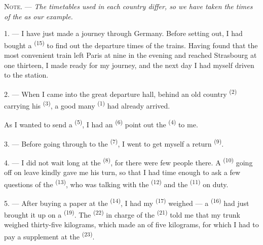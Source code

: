 
\VUsaut{4.0mm}
\VUsaut{2.4mm}
\VUsaut{3.4mm}
\textsc{Note.} --- \textit{The timetables used in each country differ, so
we have taken the times of the}  \textit{as our
example.}

1. --- I have just made a journey through Germany. Before setting out, I
had bought a  \textsuperscript{(15)} to find out the departure times
of the trains. Having found that the most convenient train left Paris at
nine in the evening and reached Strasbourg at one thirteen, I made ready
for my journey, and the next day I had myself driven to the station.

2. --- When I came into the great departure hall, behind an old country
 \textsuperscript{(2)} carrying his 
\textsuperscript{(3)}, a good many  \textsuperscript{(1)} had already
arrived.

As I wanted to send a  \textsuperscript{(5)}, I had an
 \textsuperscript{(6)} point out the 
\textsuperscript{(4)} to me.

3. --- Before going through to the  \textsuperscript{(7)}, I went
to get myself a return  \textsuperscript{(9)}.

4. --- I did not wait long at the  \textsuperscript{(8)}, for
there were few people there. A  \textsuperscript{(10)} going off on
leave kindly gave me his turn, so that I had time enough to ask a few
questions of the  \textsuperscript{(13)}, who was talking with
the  \textsuperscript{(12)} and the 
\textsuperscript{(11)} on duty.

\VUsaut{3.0mm}

5. --- After buying a paper at the  \textsuperscript{(14)}, I had my
 \textsuperscript{(17)} weighed --- a  \textsuperscript{(16)} had
just brought it up on a  \textsuperscript{(19)}. The
 \textsuperscript{(22)} in charge of the 
\textsuperscript{(21)} told me that my trunk weighed thirty-five kilograms, which
made an  of five kilograms, for which I had to pay a
supplement at the  \textsuperscript{(23)}.

